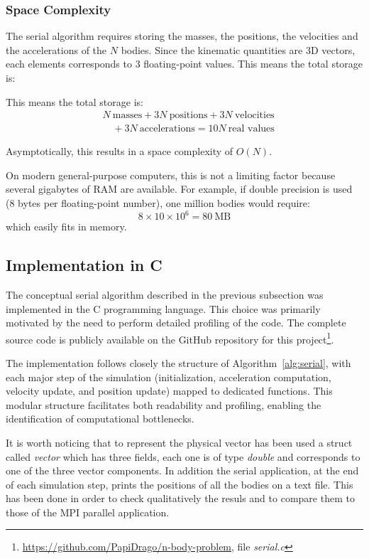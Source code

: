 \documentclass{article}
\begin{document}
\subsubsection{Space Complexity}
The serial algorithm requires storing the masses, the positions, the velocities and the accelerations of the $N$ bodies. Since the kinematic quantities are 3D vectors, each elements corresponds to 3 floating-point values.
This means the total storage is:

This means the total storage is: %
\begin{align*}
&N \ \text{masses} + 3N \ \text{positions} + 3N \ \text{velocities} \\
&\quad + 3N \ \text{accelerations} = 10N \ \text{real values}
\end{align*}

Asymptotically, this results in a space complexity of $O(N)$.  

On modern general-purpose computers, this is not a limiting factor because several gigabytes of RAM are available. For example, if double precision is used (8 bytes per floating-point number), one million bodies would require:
\[
8 \times 10 \times 10^6 = 80 \ \text{MB}
\]
which easily fits in memory.

\subsection{Implementation in C}
The conceptual serial algorithm described in the previous subsection was implemented in the C programming language. This choice was primarily motivated by the need to perform detailed profiling of the code. The complete source code is publicly available on the GitHub repository for this project\footnote{\url{https://github.com/PapiDrago/n-body-problem}, file \emph{serial.c}}.

The implementation follows closely the structure of Algorithm~\ref{alg:serial}, with each major step of the simulation (initialization, acceleration computation, velocity update, and position update) mapped to dedicated functions.
This modular structure facilitates both readability and profiling, enabling the identification of computational bottlenecks.  

It is worth noticing that to represent the physical vector has been used a struct called \emph{vector} which has three fields, each one is of type \emph{double} and corresponds to one of the three vector components.
In addition the serial application, at the end of each simulation step, prints the positions of all the bodies on a text file. This has been done in order to check qualitatively the resuls and to compare them to those of the MPI parallel application.
\end{document}
